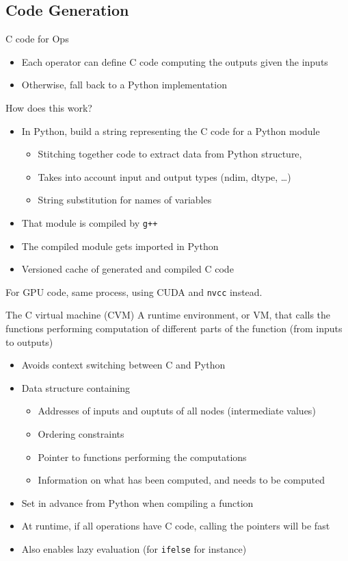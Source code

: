\documentclass[a4paper,9pt]{beamer}
\begin{document}
\subsection{Code Generation}
\begin{frame}[fragile]{C code for Ops}
  \begin{itemize}
    \item Each operator can define C code computing the outputs given the inputs
    \item Otherwise, fall back to a Python implementation
  \end{itemize}
  How does this work?
  \begin{itemize}
    \item In Python, build a string representing the C code for a Python module
    \begin{itemize}
      \item Stitching together code to extract data from Python structure,
      \item Takes into account input and output types (ndim, dtype, \ldots)
      \item String substitution for names of variables
    \end{itemize}
    \item That module is compiled by \verb|g++|
    \item The compiled module gets imported in Python
    \item Versioned cache of generated and compiled C code
  \end{itemize}
  For GPU code, same process, using CUDA and \verb|nvcc| instead.
\end{frame}

\begin{frame}[fragile]{The C virtual machine (CVM)}
  A runtime environment, or VM, that calls the functions performing
  computation of different parts of the function (from inputs to
  outputs)
  \begin{itemize}
    \item Avoids context switching between C and Python
    \item Data structure containing
      \begin{itemize}
        \item Addresses of inputs and ouptuts of all nodes (intermediate values)
        \item Ordering constraints
        \item Pointer to functions performing the computations
        \item Information on what has been computed, and needs to be computed
      \end{itemize}
    \item Set in advance from Python when compiling a function
    \item At runtime, if all operations have C code, calling the pointers will be fast
    \item Also enables lazy evaluation (for \verb|ifelse| for instance)
  \end{itemize}
\end{frame}
\end{document}
